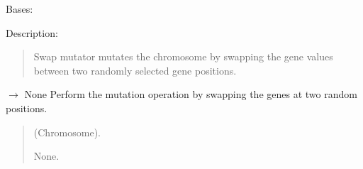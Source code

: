 \documentclass[letterpaper,10pt,english]{sphinxmanual}
\begin{document}
\begin{fulllineitems}
\label{\detokenize{pygenalgo.operators.mutation:pygenalgo.operators.mutation.swap_mutator.SwapMutator}}
\pysigstartsignatures
\pysiglinewithargsret
{}
{}
{}
\pysigstopsignatures
\sphinxAtStartPar
Bases: {\hyperref[\detokenize{pygenalgo.operators.mutation:pygenalgo.operators.mutation.mutate_operator.MutationOperator}]{}}

\sphinxAtStartPar
Description:
\begin{quote}

\sphinxAtStartPar
Swap mutator mutates the chromosome by swapping the gene
values between two randomly selected gene positions.
\end{quote}

\begin{fulllineitems}
\label{\detokenize{pygenalgo.operators.mutation:pygenalgo.operators.mutation.swap_mutator.SwapMutator.mutate}}
\pysigstartsignatures
\pysiglinewithargsret
{}
{}
{{ $\rightarrow$ None}}
\pysigstopsignatures
\sphinxAtStartPar
Perform the mutation operation by swapping the genes at two random positions.
\begin{quote}\begin{description}
\sphinxAtStartPar
{} \textendash{} (Chromosome).

\sphinxAtStartPar
None.

\end{description}\end{quote}

\end{fulllineitems}


\end{fulllineitems}
\end{document}
